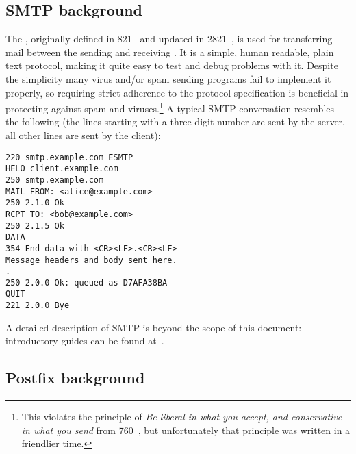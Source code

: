 \documentclass[a4paper,12pt,draft]{article}
\begin{document}
\subsection{SMTP background}
\label{SMTP background}

The \SMTPlong, originally defined in \RFC{} 821~\cite{RFC821} and updated
in \RFC{} 2821~\cite{RFC2821}, is used for transferring mail between the
sending and receiving \MTA\@.  It is a simple, human readable, plain text
protocol, making it quite easy to test and debug problems with it.  Despite
the simplicity many virus and/or spam sending programs fail to implement it
properly, so requiring strict adherence to the protocol specification is
beneficial in protecting against spam and viruses.\footnote{This violates
the principle of \textit{Be liberal in what you accept, and conservative in
what you send\/} from \RFC{} 760~\cite{rfc760}, but unfortunately that
principle was written in a friendlier time.}  A typical SMTP conversation
resembles the following (the lines starting with a three digit number are
sent by the server, all other lines are sent by the client):

\begin{verbatim}
220 smtp.example.com ESMTP
HELO client.example.com
250 smtp.example.com
MAIL FROM: <alice@example.com>
250 2.1.0 Ok
RCPT TO: <bob@example.com>
250 2.1.5 Ok
DATA
354 End data with <CR><LF>.<CR><LF>
Message headers and body sent here.
.
250 2.0.0 Ok: queued as D7AFA38BA
QUIT
221 2.0.0 Bye
\end{verbatim}

A detailed description of SMTP is beyond the scope of this document:
introductory guides can be found at~\cite{smtp-intro-01, smtp-intro-02}.

\subsection{Postfix background}
\end{document}
